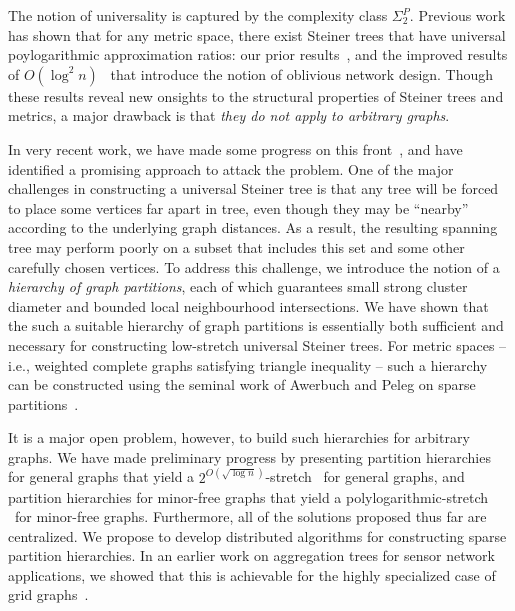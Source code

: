 
The notion of universality is captured by the complexity class
$\Sigma_2^P$.  Previous work has shown that for any metric space,
there exist Steiner trees that have universal poylogarithmic
approximation ratios: our prior results~\cite{jia+lnrs:universal}, and
the improved results of $O(\log^2 n)$~\cite{gupta+hr:oblivious} that
introduce the notion of oblivious network design.  Though these
results reveal new onsights to the structural properties of Steiner
trees and metrics, a major drawback is that {\em they do not apply to
  arbitrary graphs}.  

In very recent work, we have made some progress on this
front~\cite{busch+drrs:ust}, and have identified a promising approach
to attack the problem.  One of the major challenges in constructing a
universal Steiner tree is that any tree will be forced to place some
vertices far apart in tree, even though they may be ``nearby''
according to the underlying graph distances.  As a result, the
resulting spanning tree may perform poorly on a subset that includes
this set and some other carefully chosen vertices.  To address this
challenge, we introduce the notion of a {\em hierarchy of graph
  partitions}, each of which guarantees small strong cluster diameter
and bounded local neighbourhood intersections.  We have shown that the
such a suitable hierarchy of graph partitions is essentially both
sufficient and necessary for constructing low-stretch universal
Steiner trees.  For metric spaces -- i.e., weighted complete graphs
satisfying triangle inequality -- such a hierarchy can be constructed
using the seminal work of Awerbuch and Peleg on sparse
partitions~\cite{awerbuch+p:partition,peleg:distributeBook}.  

It is a major open problem, however, to build such hierarchies for
arbitrary graphs.  We have made preliminary progress by presenting
partition hierarchies for general graphs that yield a $2^{O(\sqrt{\log
    n})}$-stretch \ust\ for general graphs, and partition hierarchies
for minor-free graphs that yield a polylogarithmic-stretch \ust\ for
minor-free graphs.  Furthermore, all of the solutions proposed thus
far are centralized.  We propose to develop distributed algorithms for
constructing sparse partition hierarchies.  In an earlier work on
aggregation trees for sensor network applications, we showed that this
is achievable for the highly specialized case of grid
graphs~\cite{jia+nrs:gist}.

\iffalse

RELATED WORK: karger-minkoff maybecast tree, gupta-nagarajan-ravi
paper on adaptive TSP (icalp 10), and on stochastic vrp (OR, 2012) and
refs in this for previous papers on TSP with independent demands on
nodes (Bertsimas cycle heuristic). Also the basic expected target max
is like orienteering with size bound on tree, and hence related to
k-MST. Also related to garg-gupta-leonardi-sankowsi (SODA 08) which
relates to Univ TSP.
\fi

